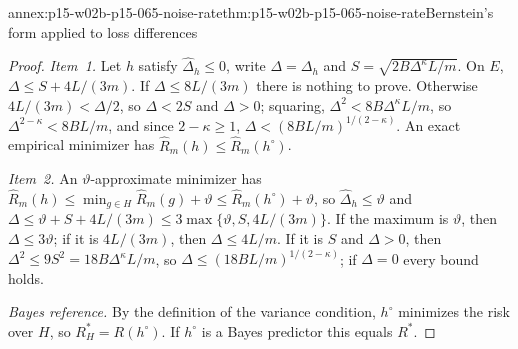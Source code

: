 \begin{annexitem}{annex:p15-w02b-p15-065-noise-rate}{thm:p15-w02b-p15-065-noise-rate}{Bernstein's form applied to loss differences}
\begin{proof}
\emph{Item~1.} Let \(h\) satisfy \(\widehat\Delta_h\leq0\), write
\(\Delta=\Delta_h\) and \(S=\sqrt{2B\Delta^{\kappa}L/m}\). On \(E\),
\(\Delta\leq S+4L/(3m)\). If \(\Delta\leq8L/(3m)\) there is nothing to
prove. Otherwise \(4L/(3m)<\Delta/2\), so \(\Delta<2S\) and \(\Delta>0\);
squaring, \(\Delta^2<8B\Delta^{\kappa}L/m\), so
\(\Delta^{2-\kappa}<8BL/m\), and since \(2-\kappa\geq1\),
\(\Delta<(8BL/m)^{1/(2-\kappa)}\). An exact empirical minimizer has
\(\widehat R_m(h)\leq\widehat R_m(h^{\circ})\).

\emph{Item~2.} An \(\vartheta\)-approximate minimizer has
\(\widehat R_m(h)\leq\min_{g\in H}\widehat R_m(g)+\vartheta
\leq\widehat R_m(h^{\circ})+\vartheta\), so \(\widehat\Delta_h\leq\vartheta\) and
\(\Delta\leq\vartheta+S+4L/(3m)\leq3\max\{\vartheta,S,4L/(3m)\}\). If the maximum
is \(\vartheta\), then \(\Delta\leq3\vartheta\); if it is \(4L/(3m)\), then
\(\Delta\leq4L/m\). If it is \(S\) and \(\Delta>0\), then
\(\Delta^2\leq9S^2=18B\Delta^{\kappa}L/m\), so
\(\Delta\leq(18BL/m)^{1/(2-\kappa)}\); if \(\Delta=0\) every bound holds.

\emph{Bayes reference.} By the definition of the variance condition,
\(h^{\circ}\) minimizes the risk over \(H\), so \(R_H^{*}=R(h^{\circ})\).
If \(h^{\circ}\) is a Bayes predictor this equals \(R^{*}\).
\end{proof}
\end{annexitem}

